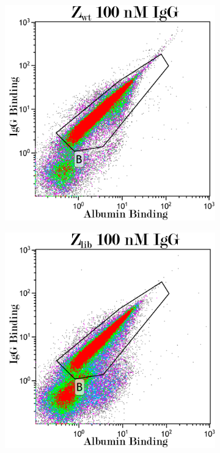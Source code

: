 \documentclass{article}
\begin{document}
\begin{multicols}{2}
\begin{figure}[H]
		\begin{subfigure}{0.45\linewidth}
			\includegraphics[width=\linewidth]{images/flow_100_wt.png}
			\label{flow_51}
		\end{subfigure}
		\begin{subfigure}{0.45\linewidth}
			\includegraphics[width=\linewidth]{images/flow_100_lib.png}
			\label{flow_52}
		\end{subfigure}
		

\end{figure}
\end{multicols}
\end{document}
